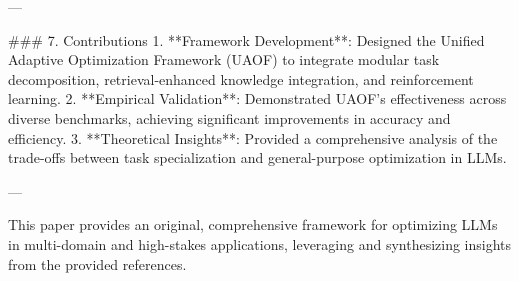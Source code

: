 ---

### 7. Contributions
1. **Framework Development**: Designed the Unified Adaptive Optimization Framework (UAOF) to integrate modular task decomposition, retrieval-enhanced knowledge integration, and reinforcement learning.
2. **Empirical Validation**: Demonstrated UAOF’s effectiveness across diverse benchmarks, achieving significant improvements in accuracy and efficiency.
3. **Theoretical Insights**: Provided a comprehensive analysis of the trade-offs between task specialization and general-purpose optimization in LLMs.

--- 

This paper provides an original, comprehensive framework for optimizing LLMs in multi-domain and high-stakes applications, leveraging and synthesizing insights from the provided references.